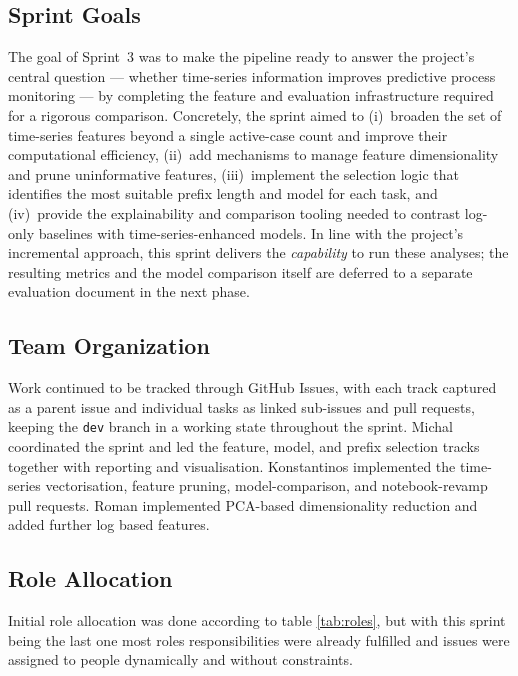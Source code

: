 \documentclass[runningheads]{llncs}
\begin{document}
\subsection{Sprint Goals}
The goal of Sprint~3 was to make the pipeline ready to answer the project's central
question --- whether time-series information improves predictive process monitoring ---
by completing the feature and evaluation infrastructure required for a rigorous comparison.
Concretely, the sprint aimed to (i)~broaden the set of time-series features beyond a single
active-case count and improve their computational efficiency, (ii)~add mechanisms to manage
feature dimensionality and prune uninformative features, (iii)~implement the selection logic
that identifies the most suitable prefix length and model for each task, and (iv)~provide the
explainability and comparison tooling needed to contrast log-only baselines with
time-series-enhanced models. In line with the project's incremental approach, this sprint
delivers the \emph{capability} to run these analyses; the resulting metrics and the model
comparison itself are deferred to a separate evaluation document in the next phase.

\subsection{Team Organization}
Work continued to be tracked through GitHub Issues, with each track captured as a parent
issue and individual tasks as linked sub-issues and pull requests, keeping the \texttt{dev}
branch in a working state throughout the sprint. Michal coordinated the sprint and led the
feature, model, and prefix selection tracks together with reporting and visualisation.
Konstantinos implemented the time-series vectorisation, feature pruning, model-comparison, and
notebook-revamp pull requests. Roman implemented PCA-based dimensionality reduction and added further log based features.

\subsection{Role Allocation}
Initial role allocation was done according to table \ref{tab:roles}, but with this sprint being the last one most roles responsibilities were already fulfilled and issues were assigned to people dynamically and without constraints.
\end{document}
